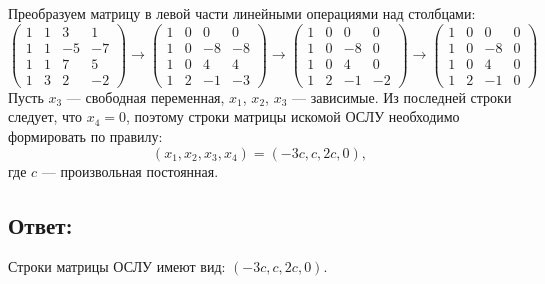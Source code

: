 \documentclass[12pt]{article}
\begin{document}
    Преобразуем матрицу в левой части линейными операциями над столбцами:
    \[
        \begin{pmatrix}
            1 & 1 & 3  & 1  \\
            1 & 1 & -5 & -7 \\
            1 & 1 & 7  & 5  \\
            1 & 3 & 2  & -2
        \end{pmatrix}
        \rightarrow
        \begin{pmatrix}
            1 & 0 & 0  & 0  \\
            1 & 0 & -8 & -8 \\
            1 & 0 & 4  & 4  \\
            1 & 2 & -1 & -3
        \end{pmatrix}
        \rightarrow
        \begin{pmatrix}
            1 & 0 & 0  & 0  \\
            1 & 0 & -8 & 0  \\
            1 & 0 & 4  & 0  \\
            1 & 2 & -1 & -2
        \end{pmatrix}
        \rightarrow
        \begin{pmatrix}
            1 & 0 & 0  & 0 \\
            1 & 0 & -8 & 0 \\
            1 & 0 & 4  & 0 \\
            1 & 2 & -1 & 0
        \end{pmatrix}
    \]
    Пусть $x_3$ --- свободная переменная, $x_1$, $x_2$, $x_3$ --- зависимые. Из последней строки следует, что $x_4 = 0$, поэтому строки матрицы искомой ОСЛУ необходимо формировать
    по правилу:
    \[
        \left ( x_1, x_2, x_3, x_4 \right ) = \left ( - 3 c, c, 2 c, 0 \right ) ,
    \]
    где $c$ --- произвольная постоянная.

    \subsection*{Ответ:}
    Строки матрицы ОСЛУ имеют вид: $\left ( -3 c, c, 2 c, 0 \right )$.
\end{document}
